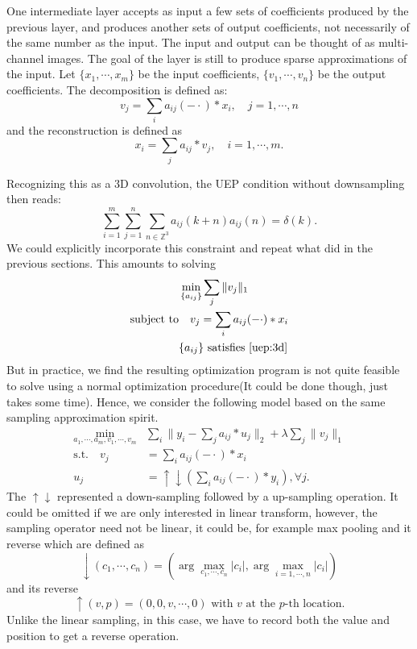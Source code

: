 One intermediate layer accepts as input a few sets of coefficients produced by the previous layer, and produces another sets of output coefficients, not necessarily of the same number as the input. The input and output can be thought of as multi-channel images. The goal of the layer is still to produce sparse approximations of the input. Let $\{x_1,\cdots,x_m\}$ be the input coefficients, $\{v_1,\cdots,v_n\}$ be the output coefficients. The decomposition is defined as:
\begin{equation}
	v_j = \sum_i a_{ij}(-\cdot)*x_i,\quad j=1,\cdots,n
\end{equation}
and the reconstruction is defined as 
\begin{equation}
	x_i = \sum_j a_{ij}*v_j, \quad i=1,\cdots, m.
\end{equation}

Recognizing this as a 3D convolution, the UEP condition without downsampling then reads:
\begin{equation}
\label{uep:3d}
	\sum_{i=1}^m\sum_{j=1}^n  \sum_{n\in \mathbb{Z}^3} a_{ij}(k+n)a_{ij}(n) = \delta(k).
\end{equation}
We could explicitly incorporate this constraint and repeat what did in the previous sections. This amounts to solving
\begin{equation}
	\begin{aligned}
		&\min_{ \{a_{ij}\} } \sum_j \|v_j\|_1 \\
		\textrm{subject to} &\quad v_j = \sum_i a_{ij}(-\cdot)*x_i \\
			&\{a_{ij}\} \textrm{ satisfies \eqref{uep:3d}} \\
	\end{aligned}
\end{equation}
 But in practice, we find the resulting optimization program is not quite feasible to solve using a normal optimization procedure(It could be done though, just takes some time). Hence, we consider the following model based on the same sampling approximation spirit.
\begin{equation}
\label{eq:m3}
\begin{aligned}
	\min_{a_1,\cdots,a_m, v_1,\cdots,v_m}& \sum_i \|y_i - \sum_j a_{ij}*u_j\|_2 +\lambda \sum_j \|v_j\|_1 \\
	 \textrm{s.t.}  \quad v_j& = \sum_{i} a_{ij}(-\cdot)*x_i \\
		u_j&=\uparrow\downarrow(\sum_i a_{ij}(-\cdot)*y_i), \forall j.
	\end{aligned}
\end{equation}
The $\uparrow \downarrow$ represented a down-sampling followed by a up-sampling operation. It could be omitted if we are only interested in linear transform, however, the sampling operator need not be linear, it could be, for example max pooling and it reverse which are defined as 
\[
	\downarrow(c_1,\cdots,c_n) = (\arg\max_{c_1,\cdots,c_n} |c_i|, \arg\max_{i=1,\cdots,n} |c_i|)
\]
and its reverse
\[
	\uparrow(v,p)=(0,0,v,\cdots,0) \textrm{ with $v$ at the $p$-th location}.
\]
Unlike the linear sampling, in this case, we have to record both the value and position to get a reverse operation.

